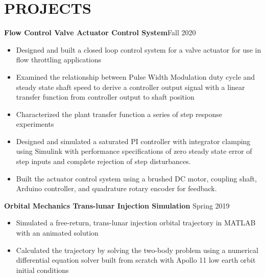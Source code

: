 \documentclass{article}
\begin{document}
\section{PROJECTS}
\textbf{Flow Control Valve Actuator Control System}\hfill Fall 2020
\vspace{0.5em}
\begin{itemize}
	\item Designed and built a closed loop control system for a valve actuator for use in flow throttling applications
	\item Examined the relationship between Pulse Width Modulation duty cycle and steady state shaft speed to derive a controller output signal with a linear transfer function from controller output to shaft position  
	\item Characterized the plant transfer function a series of step response experiments
	\item  Designed and simulated a saturated PI controller with integrator clamping using Simulink with performance specifications of zero steady state error of step inputs and complete rejection of step disturbances.
	\item  Built the actuator control system using a brushed DC motor, coupling shaft, Arduino controller, and quadrature rotary encoder for feedback.
\end{itemize}
\vspace{0.5em}
\textbf{Orbital Mechanics Trans-lunar Injection Simulation} 
\hfill
Spring 2019
\vspace{0.5em}
\begin{itemize}
	\item Simulated a free-return, trans-lunar injection orbital trajectory in MATLAB with an animated solution
	\item Calculated the trajectory by solving the two-body problem using a numerical differential equation solver built from scratch with Apollo 11 low earth orbit initial conditions
\end{itemize}

\thispagestyle{empty}
\end{document}
